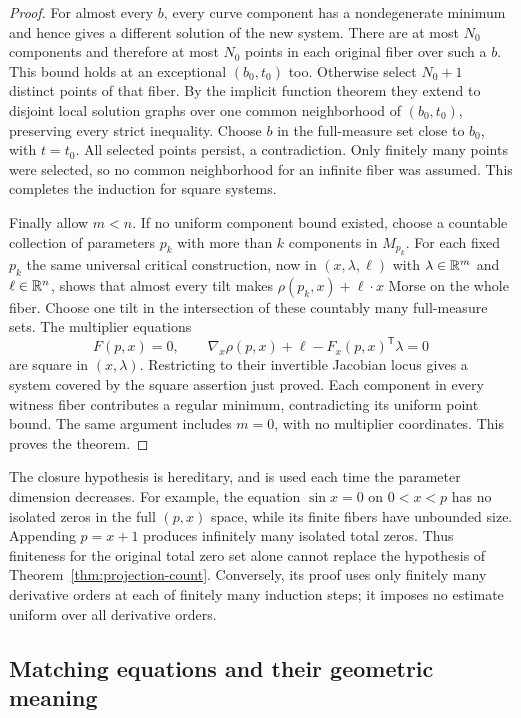 \begin{proof}
For almost every $b$, every curve component has a nondegenerate
minimum and hence gives a different solution of the new system.
There are at most $N_0$ components and therefore at most $N_0$ points
in each original fiber over such a $b$.  This bound holds at an
exceptional $(b_0,t_0)$ too.  Otherwise select $N_0+1$ distinct points
of that fiber.  By the implicit function theorem they extend to
disjoint local solution graphs over one common neighborhood of
$(b_0,t_0)$, preserving every strict inequality.  Choose $b$ in the
full-measure set close to $b_0$, with $t=t_0$.  All selected points
persist, a contradiction.  Only finitely many points were selected,
so no common neighborhood for an infinite fiber was assumed.  This
completes the induction for square systems.

Finally allow $m<n$.  If no uniform component bound existed, choose
a countable collection of parameters $p_k$ with more than $k$
components in $M_{p_k}$.  For each fixed $p_k$ the same universal
critical construction, now in $(x,\lambda,\ell)$ with
$\lambda\in\mathbb{R}^m$ and $\ell\in\mathbb{R}^n$, shows that almost every
tilt makes $\rho(p_k,x)+\ell\cdot x$ Morse on the whole fiber.
Choose one tilt in the intersection of these countably many
full-measure sets.  The multiplier equations
\[
 F(p,x)=0,
 \qquad \nabla_x\rho(p,x)+\ell-F_x(p,x)^{\mathsf T}\lambda=0
\]
are square in $(x,\lambda)$.  Restricting to their invertible
Jacobian locus gives a system covered by the square assertion just
proved.  Each component in every witness fiber contributes a regular
minimum, contradicting its uniform point bound.  The same argument
includes $m=0$, with no multiplier coordinates.  This proves the
theorem.
\end{proof}

\begin{remark}\label{rem:counting-closure}
The closure hypothesis is hereditary, and is used each time the
parameter dimension decreases.  For example, the equation
$\sin x=0$ on $0<x<p$ has no isolated zeros in the full $(p,x)$ space,
while its finite fibers have unbounded size.  Appending $p=x+1$
produces infinitely many isolated total zeros.  Thus finiteness for
the original total zero set alone cannot replace the hypothesis of
Theorem~\ref{thm:projection-count}.  Conversely, its proof uses only
finitely many derivative orders at each of finitely many induction
steps; it imposes no estimate uniform over all derivative orders.
\end{remark}

\subsection{Matching equations and their geometric meaning}


